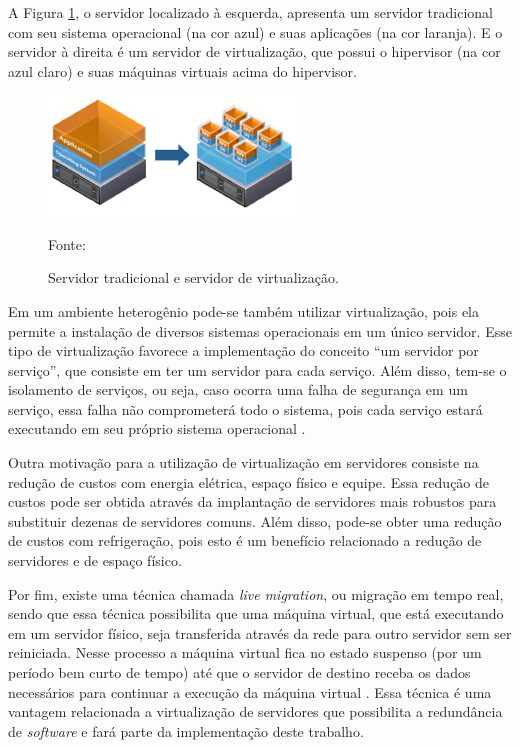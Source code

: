 A Figura \ref{fig:virtualizacao_servidores}, o servidor localizado à esquerda, apresenta um servidor tradicional com seu sistema operacional 
(na cor azul) e suas aplicações (na cor laranja). E o servidor à direita é um servidor de virtualização, que possui o hipervisor 
(na cor azul claro) e suas máquinas virtuais acima do hipervisor.

\begin{figure}[h!]
 \centering
 \includegraphics[width=250px]{img/virtualizacao_servidores.eps}
 \caption{Servidor tradicional e servidor de virtualização.}
 \label{fig:virtualizacao_servidores}
 Fonte: \citet{interspire2016}
\end{figure}

Em um ambiente heterogênio pode-se também utilizar virtualização, pois ela permite a instalação de diversos sistemas operacionais em um 
único servidor. Esse tipo de virtualização favorece a implementação do conceito ``um servidor por serviço'', que consiste em ter um servidor 
para cada serviço. Além disso, tem-se o isolamento de serviços, ou seja, caso ocorra uma falha de segurança em um serviço, essa falha não 
comprometerá todo o sistema, pois cada serviço estará executando em seu próprio sistema operacional \cite{carissimi2008}.

Outra motivação para a utilização de virtualização em servidores consiste na redução de custos com energia elétrica, espaço físico e equipe. 
Essa redução de custos pode ser obtida através da implantação de servidores mais robustos para substituir dezenas de servidores comuns. 
Além disso, pode-se obter uma redução de custos com refrigeração, pois esto é um benefício relacionado a redução de servidores e de espaço físico.

Por fim, existe uma técnica chamada \textit{live migration}, ou migração em tempo real, sendo que essa técnica possibilita que uma máquina virtual, 
que está executando em um servidor físico, seja transferida através da rede para outro servidor sem ser reiniciada. Nesse processo a máquina 
virtual fica no estado suspenso (por um período bem curto de tempo) até que o servidor de destino receba os dados necessários para continuar 
a execução da máquina virtual \cite{silva2009}. Essa técnica é uma vantagem relacionada a virtualização de servidores que possibilita a redundância
de \textit{software} e fará parte da implementação deste trabalho.

